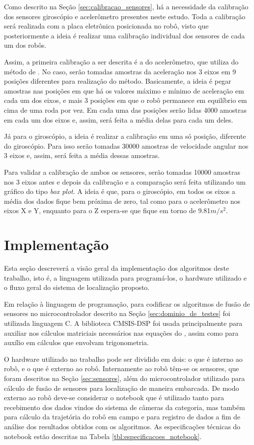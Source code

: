 \documentclass[acronym, symbols, table]{fei}
\begin{document}
		Como descrito na Seção \ref{sec:calibracao_sensores}, há a necessidade da calibração dos sensores giroscópio e acelerômetro presentes neste estudo. Toda a calibração será realizada com a placa eletrônica posicionada no robô, visto que posteriormente a ideia é realizar uma calibração individual dos sensores de cada um dos robôs.
		
		Assim, a primeira calibração a ser descrita é a do acelerômetro, que utiliza do método de \textcite{menezes2020triaxial}. No caso, serão tomadas amostras da aceleração nos 3 eixos em 9 posições diferentes para realização do método. Basicamente, a ideia é pegar amostras nas posições em que há os valores máximo e mínimo de aceleração em cada um dos eixos, e mais 3 posições em que o robô permanece em equilíbrio em cima de uma roda por vez. Em cada uma das posições serão lidas 4000 amostras em cada um dos eixos e, assim, será feita a média delas para cada um deles.
		
		Já para o giroscópio, a ideia é realizar a calibração em uma só posição, diferente do giroscópio. Para isso serão tomadas 30000 amostras de velocidade angular nos 3 eixos e, assim, será feita a média dessas amostras.
		
		Para validar a calibração de ambos os sensores, serão tomadas 10000 amostras nos 3 eixos antes e depois da calibração e a comparação será feita utilizando um gráfico do tipo \textit{box plot}. A ideia é que, para o giroscópio, em todos os eixos a média dos dados fique bem próxima de zero, tal como para o acelerômetro nos eixos X e Y, enquanto para o Z espera-se que fique em torno de 9.81$m/s^{2}$.
		
	\section{Implementação}
	
		Esta seção descreverá a visão geral da implementação dos algoritmos deste trabalho, isto é, a linguagem utilizada para programá-los, o hardware utilizado e o fluxo geral do sistema de localização proposto.
		
		Em relação à linguagem de programação, para codificar os algoritmos de fusão de sensores no microcontrolador descrito na Seção \ref{sec:dominio_de_testes} foi utilizada linguagem C. A biblioteca CMSIS-DSP foi usada principalmente para auxiliar nos cálculos matriciais necessários nas equações do , assim como para auxílio em cálculos que envolvam trigonometria.
		
		O hardware utilizado no trabalho pode ser dividido em dois: o que é interno ao robô, e o que é externo ao robô. Internamente ao robô têm-se os sensores, que foram descritos na Seção \ref{sec:sensores}, além do microcontrolador utilizado para cálculo de fusão de sensores para localização de maneira embarcada. De modo externo ao robô deve-se considerar o notebook que é utilizado tanto para recebimento dos dados vindos do sistema de câmeras da categoria, mas também para cálculo da trajetória do robô em campo e para registro de dados a fim de análise dos resultados obtidos com os algoritmos. As especificações técnicas do notebook estão descritas na Tabela \ref{tbl:especificacoes_notebook}.
		
\end{document}
